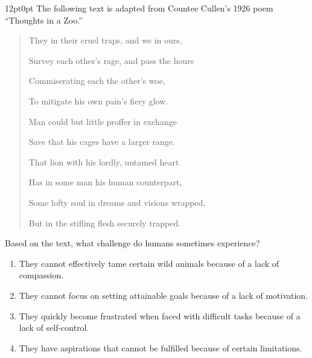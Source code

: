 \documentclass[11pt, twocolumn]{article}
\newcounter{questionnum}
\begin{document}
\vspace{6pt}\noindent
\begin{minipage}{\columnwidth}\raggedright
\noindent{}\par\vspace{8pt}
\begin{adjustwidth}{12pt}{0pt}
The following text is adapted from Countee Cullen's 1926 poem ``Thoughts in a Zoo.'' 

\vspace{6pt}
\begin{quote}

They in their cruel traps, and we in ours,  

Survey each other's rage, and pass the hours  

Commiserating each the other's woe,  

To mitigate his own pain's fiery glow.  

Man could but little proffer in exchange  

Save that his cages have a larger range.  

That lion with his lordly, untamed heart  

Has in some man his human counterpart,

Some lofty soul in dreams and visions wrapped,  

But in the stifling flesh securely trapped.

\end{quote}
\vspace{6pt}

Based on the text, what challenge do humans sometimes experience?
\begin{enumerate}[label=\Alph*),leftmargin=18pt,topsep=3pt,itemsep=2pt]
  \item They cannot effectively tame certain wild animals because of a lack of compassion.
  \item They cannot focus on setting attainable goals because of a lack of motivation.
  \item They quickly become frustrated when faced with difficult tasks because of a lack of self-control.
  \item They have aspirations that cannot be fulfilled because of certain limitations.
\end{enumerate}
\end{adjustwidth}
\end{minipage}\par
\end{document}
